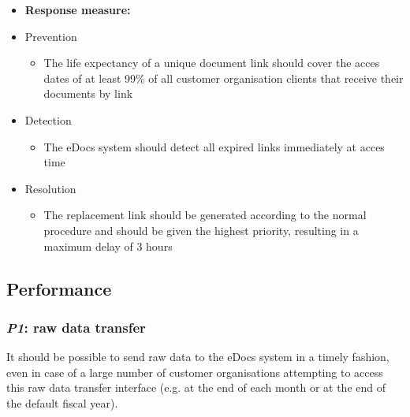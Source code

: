 \documentclass[a4paper,10pt]{article}
\begin{document}
\begin{itemize}
    \item \textbf{Response measure:}
            \item Prevention
		\begin{itemize}
			\item The life expectancy of a unique document link should cover the acces dates of at least 99\% of all customer organisation clients that receive their documents by link
		\end{itemize}
            \item Detection
		\begin{itemize}
			\item The eDocs system should detect all expired links immediately at acces time
		\end{itemize}
            \item Resolution
		\begin{itemize}
			\item The replacement link should be generated according to the normal procedure and should be given the highest priority, resulting in a maximum delay of 3 hours
		\end{itemize}
\end{itemize}

\subsection{Performance}
\subsubsection{\emph{P1}: raw data transfer }
It should  be possible to send raw data to the eDocs system in a timely fashion, even in case of a large number of customer organisations attempting to access this raw data transfer interface (e.g. at the end of each month or at the end of the default fiscal year).
\end{document}
